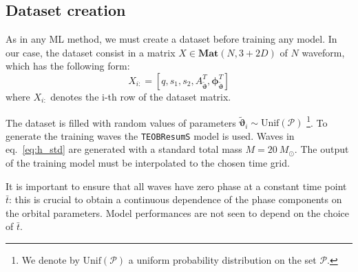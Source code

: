 \subsection{Dataset creation}
As in any ML method, we must create a dataset before training any model.
In our case, the dataset consist in a matrix ${X \in \mathbf{Mat}(N,3+2D)}$ of $N$ waveform, which has the following form:
\begin{equation} \label{eq:dataset}
	X_{i:} = [q,s_1,s_2, {A}_{{\tilde{\boldsymbol{\vartheta}}}}^T, \boldsymbol{\phi}_{{\tilde{\boldsymbol{\vartheta}}}}^T]
\end{equation}
where $X_{i:}$ denotes the i-th row of the dataset matrix.
\par
The dataset is filled with random values of parameters ${\tilde{\boldsymbol{\vartheta}}}_i \sim \textrm{Unif}(\mathcal{P})$
\footnote{We denote by $\textrm{Unif}(\mathcal{P})$ a uniform probability distribution on the set $\mathcal{P}$.}.
To generate the training waves the \texttt{TEOBResumS} model is used.
Waves in eq.~\eqref{eq:h_std} are generated with a standard total mass $M = \SI{20}{M_\odot}$.
The output of the training model must be interpolated to the chosen time grid.
\par
It is important to ensure that all waves have zero phase at a constant time point $\bar{t}$: this is crucial to obtain a continuous dependence of the phase components on the orbital parameters. Model performances are not seen to depend on the choice of $\bar{t}$.
